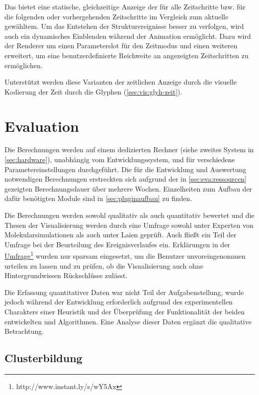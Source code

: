 Das  bietet eine statische, gleichzeitige Anzeige der  für alle Zeitschritte bzw. für die folgenden oder vorhergehenden Zeitschritte im Vergleich zum aktuelle gewähltem. Um das Entstehen der Strukturereignisse besser zu verfolgen, wird auch ein dynamisches Einblenden während der Animation ermöglicht.
Dazu wird der Renderer um einen Parameterslot für den Zeitmodus und einen weiteren erweitert, um eine benutzerdefinierte Reichweite an angezeigten Zeitschritten zu ermöglichen.

Unterstützt werden diese Varianten der zeitlichen Anzeige durch die visuelle Kodierung der Zeit durch die Glyphen (\autoref{sec:vis:glyh-zeit}).




\chapter{Evaluation}

Die Berechnungen werden auf einem dedizierten Rechner (siehe zweites System in \autoref{sec:hardware}), unabhängig vom Entwicklungssystem, und für verschiedene Parametereinstellungen durchgeführt. Die für die Entwicklung und Auswertung notwendigen Berechnungen erstreckten sich aufgrund der in \autoref{sec:eva:ressourcen} gezeigten Berechnungsdauer über mehrere Wochen. Einzelheiten zum Aufbau der dafür benötigten Module sind in \autoref{sec:pluginaufbau} zu finden.

Die Berechnungen werden sowohl qualitativ als auch quantitativ bewertet und die Thesen der Visualisierung werden durch eine Umfrage sowohl unter Experten von Molekularsimulationen als auch unter Laien geprüft. Auch fließt ein Teil der Umfrage bei der Beurteilung des Ereignisverlaufes ein. Erklärungen in der \href{http://www.instant.ly/s/wY5Ax}{Umfrage}\footnote{http://www.instant.ly/s/wY5Ax} wurden nur sparsam eingesetzt, um die Benutzer unvoreingenommen urteilen zu lassen und zu prüfen, ob die Visualisierung auch ohne Hintergrundwissen Rückschlüsse zulässt.

Die Erfassung quantitativer Daten war nicht Teil der Aufgabenstellung, wurde jedoch während der Entwicklung erforderlich aufgrund des experimentellen Charakters einer Heuristik und der Überprüfung der Funktionalität der beiden entwickelten \CFD und \SECC Algorithmen. Eine Analyse dieser Daten ergänzt die qualitative Betrachtung.

\section{Clusterbildung}\label{sec:eva:cluster}

